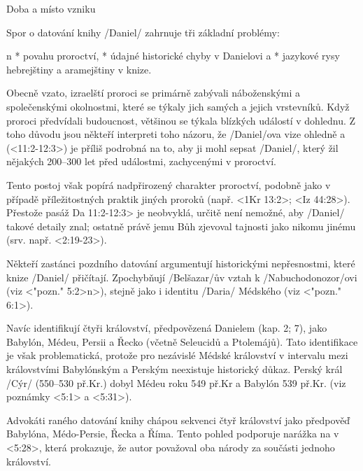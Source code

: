 Doba a místo vzniku

Spor o datování knihy \x/Daniel/ zahrnuje tři základní problémy:

\begitems \style n
* povahu proroctví,
* údajné historické chyby v Danielovi a 
* jazykové rysy hebrejštiny a aramejštiny v knize.
\enditems

Obecně vzato, izraelští proroci se primárně zabývali náboženskými a společenskými okolnostmi, které se týkaly jich samých a jejich vrstevníků. Když proroci předvídali budoucnost, většinou se týkala blízkých událostí v dohlednu.
Z toho důvodu jsou někteří interpreti toho názoru, že \x/Daniel/ova vize ohledně  a  (<11:2-12:3>) je příliš podrobná na to, aby ji mohl sepsat \x/Daniel/, který žil nějakých 200--300 let před událostmi, zachycenými v proroctví.

Tento postoj však popírá nadpřirozený charakter proroctví, podobně jako v případě příležitostných praktik jiných proroků (např. <1Kr 13:2>; <Iz 44:28>). Přestože pasáž  \<Da 11:2-12:3> je neobvyklá, určitě není nemožné, aby \x/Daniel/ takové detaily znal; ostatně právě jemu Bůh zjevoval tajnosti jako nikomu jinému (srv. např. <2:19-23>).  

Někteří zastánci pozdního datování argumentují historickými nepřesnostmi, které knize \x/Daniel/ přičítají.
Zpochybňují \x/Belšazar/ův vztah k \x/Nabuchodonozor/ovi (viz <"pozn." 5:2>n>), stejně jako i identitu  \x/Daria/ Médského (viz <"pozn." 6:1>). 

Navíc identifikují čtyři království, předpovězená Danielem (kap. 2; 7), jako Babylón, Médeu, Persii a Řecko (včetně Seleucidů a Ptolemájů). Tato identifikace je však problematická, protože pro nezávislé Médské království v intervalu mezi královstvími Babylónským a Perským neexistuje historický důkaz.
Perský král \x/Cýr/ (550--530 př.Kr.) dobyl Médeu roku 549 př.Kr a Babylón 539 př.Kr. (viz poznámky <5:1> a <5:31>).

Advokáti raného datování knihy chápou sekvenci čtyř království jako předpověď Babylóna, Médo-Persie, Řecka a Říma. 
Tento pohled podporuje narážka na  v <5:28>, která prokazuje, že autor považoval oba národy za součásti jednoho království.

